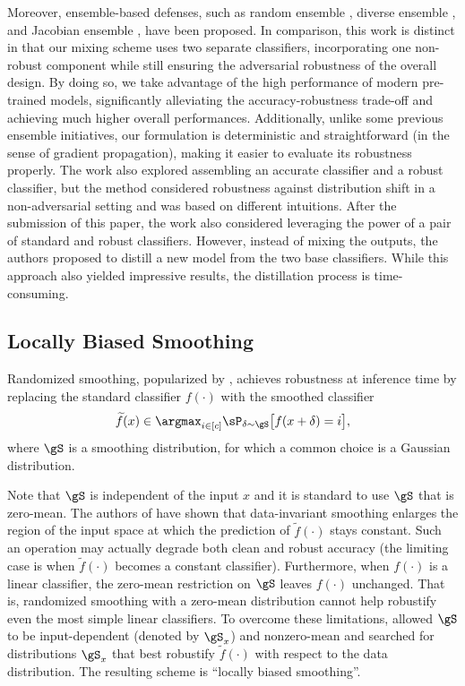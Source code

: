 \documentclass[11pt, letterpaper]{article}
\theoremstyle{plain}
\theoremstyle{definition}
\begin{document}
Moreover, ensemble-based defenses, such as random ensemble \citep{Liu18}, diverse ensemble \citep{Pang19, Alam22, Adam20}, and Jacobian ensemble \citep{Co22}, have been proposed. In comparison, this work is distinct in that our mixing scheme uses two separate classifiers, incorporating one non-robust component while still ensuring the adversarial robustness of the overall design. By doing so, we take advantage of the high performance of modern pre-trained models, significantly alleviating the accuracy-robustness trade-off and achieving much higher overall performances. Additionally, unlike some previous ensemble initiatives, our formulation is deterministic and straightforward (in the sense of gradient propagation), making it easier to evaluate its robustness properly. The work \citep{Kumar22} also explored assembling an accurate classifier and a robust classifier, but the method considered robustness against distribution shift in a non-adversarial setting and was based on different intuitions. After the submission of this paper, the work \citep{Zhao23} also considered leveraging the power of a pair of standard and robust classifiers. However, instead of mixing the outputs, the authors proposed to distill a new model from the two base classifiers. While this approach also yielded impressive results, the distillation process is time-consuming.


\subsection{Locally Biased Smoothing} \label{sec:local_biased_smoothing}

Randomized smoothing, popularized by \citep{Cohen19}, achieves robustness at inference time by replacing the standard classifier $f (\cdot)$ with the smoothed classifier
\begin{equation*}
	\widetilde{f} (x) \in \argmax_{i \in [c]} \sP_{\delta \sim \gS} \big[ f (x+\delta) = i \big],
\end{equation*}
where $\gS$ is a smoothing distribution, for which a common choice is a Gaussian distribution.

Note that $\gS$ is independent of the input $x$ and it is standard to use $\gS$ that is zero-mean. The authors of \citep{Anderson21b} have shown that data-invariant smoothing enlarges the region of the input space at which the prediction of $\widetilde{f}(\cdot)$ stays constant. Such an operation may actually degrade both clean and robust accuracy (the limiting case is when $\widetilde{f} (\cdot)$ becomes a constant classifier). Furthermore, when $f (\cdot)$ is a linear classifier, the zero-mean restriction on $\gS$ leaves $f(\cdot)$ unchanged. That is, randomized smoothing with a zero-mean distribution cannot help robustify even the most simple linear classifiers. To overcome these limitations, \citep{Anderson21b} allowed $\gS$ to be input-dependent (denoted by $\gS_x$) and nonzero-mean and searched for distributions $\gS_x$ that best robustify $\tilde{f}(\cdot)$ with respect to the data distribution. The resulting scheme is ``locally biased smoothing''.
\end{document}
